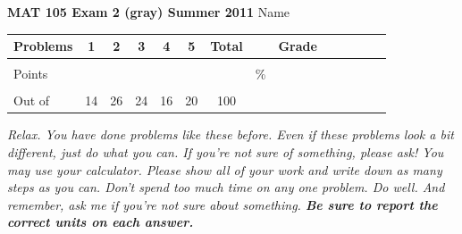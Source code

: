 \documentclass[12pt]{article}
\begin{document}
\textbf{MAT 105 Exam 2 (gray) Summer 2011} \hspace{.4in} {\large Name} \hrulefill

\begin{center}

\begin{tabular}
{|l|c|c|c|c|c|c|c|c|c|c|c|c|c|} \hline

 Problems & \hspace{5 pt} 1 \hspace{5 pt}  & \hspace{5 pt} 2 \hspace{5 pt} & \hspace{5 pt} 3  \hspace{5 pt} & \hspace{5 pt} 4  \hspace{5 pt} & \hspace{5 pt}5 \hspace{5 pt} & \hspace{5 pt} Total  \hspace{5 pt} & &  \hspace{5 pt} Grade \hspace{5 pt}  \\ \hline
&&&&&&&&\\  
Points &&&&&&&    \hspace{.8in}\% &  \\ 
&&&&&&&& \\  \hline
Out of & 14 & 26 & 24  & 16 & 20 &100 & & \\ \hline

\end {tabular}

\end{center}

\vspace{.2in}

 \emph{Relax.  You have done problems like these before.  Even if these problems look a bit different, just do what you can.  If you're not sure of something, please ask! You may use your calculator.  Please show all of your work and write down as many steps as you can.  Don't spend too much time on any one problem.  Do well.  And remember, ask me if you're not sure about something. \textbf{Be sure to report the correct units on each answer.}}

\hrulefill
\end{document}
